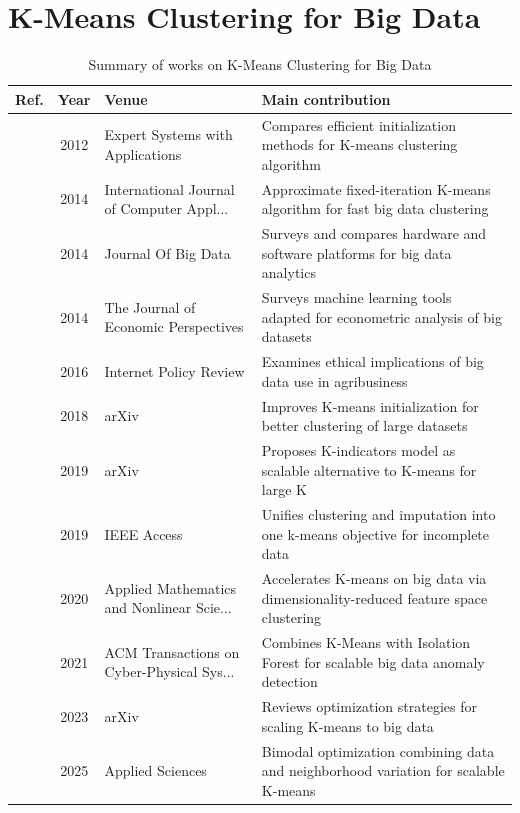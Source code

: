 \section{K-Means Clustering for Big Data}\label{sec:theme4}
\begin{table}[!t]
\centering
\renewcommand{\arraystretch}{1.2}
\caption{Summary of works on K-Means Clustering for Big Data}\label{tab:theme4}
\begin{tabularx}{\textwidth}{@{}l c p{3.6cm} X@{}}
\toprule
\textbf{Ref.} & \textbf{Year} & \textbf{Venue} & \textbf{Main contribution} \\
\midrule
\cite{celebi2012comparative} & 2012 & Expert Systems with Applications & Compares efficient initialization methods for K-means clustering algorithm \\
\cite{jain2014adapting} & 2014 & International Journal of Computer Appl... & Approximate fixed-iteration K-means algorithm for fast big data clustering \\
\cite{singh2014survey} & 2014 & Journal Of Big Data & Surveys and compares hardware and software platforms for big data analytics \\
\cite{varian2014big} & 2014 & The Journal of Economic Perspectives & Surveys machine learning tools adapted for econometric analysis of big datasets \\
\cite{carbonell2016ethics} & 2016 & Internet Policy Review & Examines ethical implications of big data use in agribusiness \\
\cite{ekta2018improved} & 2018 & arXiv & Improves K-means initialization for better clustering of large datasets \\
\cite{chen2019big} & 2019 & arXiv & Proposes K-indicators model as scalable alternative to K-means for large K \\
\cite{wang2019means} & 2019 & IEEE Access & Unifies clustering and imputation into one k-means objective for incomplete data \\
\cite{xie2020improvement} & 2020 & Applied Mathematics and Nonlinear Scie... & Accelerates K-means on big data via dimensionality-reduced feature space clustering \\
\cite{laskar2021extending} & 2021 & ACM Transactions on Cyber-Physical Sys... & Combines K-Means with Isolation Forest for scalable big data anomaly detection \\
\cite{mussabayev2023comparative} & 2023 & arXiv & Reviews optimization strategies for scaling K-means to big data \\
\cite{mussabayev2025bimodalclust} & 2025 & Applied Sciences & Bimodal optimization combining data and neighborhood variation for scalable K-means \\
\bottomrule
\end{tabularx}
\end{table}

